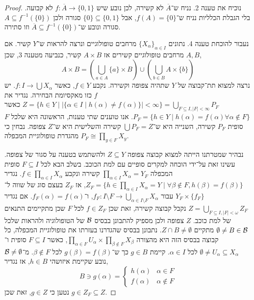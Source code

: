 \begin{proof}
	נוכיח את טענה 2.
	נניח ש־$\overline{A}$ לא קשירה, לכן נובע שיש $f : \overline{A} \to \{0, 1\}$ לא קבועה.
	בלי הגבלת הכלליות נניח ש־$f(A) = \{ 0 \}$, אבל $\{ 0 \} \subseteq \{0, 1\}$ סגורה ולכן $A \subseteq f^{-1}(\{0\})$ סגורה ונובע ש־$\overline{A} \subseteq f^{-1}(\{0\})$ וזו סתירה.

	נעבור להוכחת טענה 4.
	נתונים ${\{ X_{\alpha} \}}_{\alpha \in I}$ מרחבים טופולוגיים ונרצה להראות ש־$Y$ קשיר.
	אם $A, B$ מרחבים טופולוגיים קשירים אז $A \times B$ קשיר, כנביעה מטענה 3, שכן,
	\[
		A \times B
		= ( \bigcup_{a \in A} \{ a \} \times B ) \cup ( \bigcup_{b \in B} A \times \{ b \} )
	\]
	נרצה למצוא תת־קבוצה של $Y$ שתהיה צפופה וקשירה.
	נקבע $f \in Y$, כאשר $f : I \to \bigcup X_{\alpha}$.
	יש $f$ כזו מאקסיומת הבחירה.
	נגדיר את $Z = \{ h \in Y \mid |\{ \alpha \in I \mid h(\alpha) \ne f(\alpha) \}| < \infty \} = \bigcup_{F \subseteq I, |F| < \infty} P_F$ כאשר $P_F = \{h \in Y \mid h(\alpha) = f(\alpha) \forall \alpha \notin F\}$.
	אנו טוענים שתי טענות, הראשונה היא שלכל $F$ סופית $P_F$ קשירה, השנייה היא ש־$\bigcup P_F = Z$ קשירה והשלישית היא ש־$Z$ צפופה.
	נבחין כי $P_F \cong \prod_{y \in F} X_y$ מהגדרת טופולוגיית המכפלה.

	נבהיר שמטרתנו הייתה למצוא קבוצה צפופה $Z \subseteq Y$ ולהשתמש בטענה על סגור של צפופה.
	עשינו זאת על־ידי הוכחה למקרים סופיים עם למת הכוכב.
	בשלב הבא לכל $F \subseteq I$ סופית המכפלה $\prod_{\alpha \in I} X_{\alpha} = Y_F$ קשירה ונקבע $f \in \prod_{\alpha \in I}  X_{\alpha}$.
	נגדיר $Z_F = \{ h \in \prod_{\alpha \in I} X_{\alpha} = Y \mid \forall \beta \notin F, h(\beta) = f(\beta) \}$,
	אז $Z_F$ בעצם סוג של שווה ל־$Y_F \times \{ f_F \}$ עבור $f_F : I \setminus F \to \bigcup_{\alpha \in I \setminus F} X_{\alpha}$, ו־$f_F(\alpha) = f(\alpha)$.
	אם נגדיר $Z = \bigcup_{F \subseteq I, |F| < \omega} Z_F$ נקבל קבוצה קשירה, זאת שכן $f \in Z_F$ לכל $F$ שכן מתקיימים התנאים של למת כוכב.
	$Z$ צפופה ולכן מספיק להתבונן בבסיס $\mathcal{B}$ של הטופולוגיה ולהראות שלכל $\emptyset \ne B \in \mathcal{B}$ מתקיים $Z \cap B \ne \emptyset$.
	נתבונן בבסיס שהגדרנו בעזרתו את טופולוגיית המכפלה, כל קבוצה בבסיס הזה היא מהצורה $\prod_{\alpha \in F} U_{\alpha} \times \prod_{\beta \notin F} X_{\beta}$,
	כאשר $F \subseteq I$ סופית ו־$\emptyset \ne U_{\alpha} \subseteq X_{\alpha}$ לכל $\alpha \in I$.
	קיימת $g \in B$ כך ש־$g(\beta) = f(\beta)$ לכל $\beta \notin F$.
	מ־$\mathcal{B} \ne \emptyset$ נובע שקיימת איזושהי $h \in B$, אז נגדיר,
	\[
		B
		\ni g(\alpha)
		= \begin{cases}
			h(\alpha) & \alpha \in F \\
			f(\alpha) & \alpha \notin F
		\end{cases}
	\] 
	נטען כי $g \in Z$, זאת שכן $g \in Z_F \subseteq Z$.
\end{proof}

